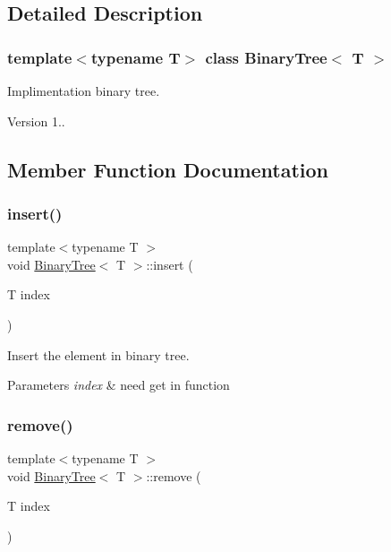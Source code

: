 \subsection{Detailed Description}
\subsubsection*{template$<$typename T$>$\newline
class Binary\+Tree$<$ T $>$}

Implimentation binary tree. 

\begin{DoxyVersion}{Version}
1.. 
\end{DoxyVersion}


\subsection{Member Function Documentation}
\mbox{\label{classBinaryTree_aad96066a6cd38d891d236c4917439209}} 
\subsubsection{\texorpdfstring{insert()}{insert()}}
{\footnotesize\ttfamily template$<$typename T $>$ \\
void \hyperlink{classBinaryTree}{Binary\+Tree}$<$ T $>$\+::insert (\begin{DoxyParamCaption}\item[{T}]{index }\end{DoxyParamCaption})}



Insert the element in binary tree. 


\begin{DoxyParams}{Parameters}
{\em index} & need get in function \\
\hline
\end{DoxyParams}
\mbox{\label{classBinaryTree_a515c06a7a49a8ee56d8fc3a4b6452938}} 
\subsubsection{\texorpdfstring{remove()}{remove()}}
{\footnotesize\ttfamily template$<$typename T $>$ \\
void \hyperlink{classBinaryTree}{Binary\+Tree}$<$ T $>$\+::remove (\begin{DoxyParamCaption}\item[{T}]{index }\end{DoxyParamCaption})}




